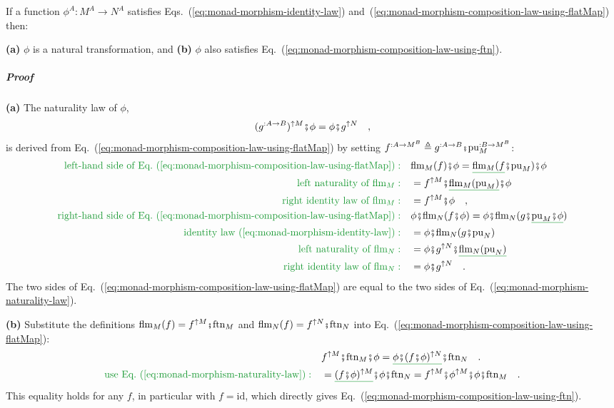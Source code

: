 If a function $\phi^{A}:M^{A}\rightarrow N^{A}$ satisfies Eqs.~(\ref{eq:monad-morphism-identity-law})
and~(\ref{eq:monad-morphism-composition-law-using-flatMap}) then:

\textbf{(a)} $\phi$ is a natural transformation, and \textbf{(b)}
$\phi$ also satisfies Eq.~(\ref{eq:monad-morphism-composition-law-using-ftn}).

\subparagraph{Proof}

\textbf{(a)} The naturality law of $\phi$,
\begin{equation}
(g^{:A\rightarrow B})^{\uparrow M}\bef\phi=\phi\bef g^{\uparrow N}\quad,\label{eq:monad-morphism-naturality-law}
\end{equation}
is derived from Eq.~(\ref{eq:monad-morphism-composition-law-using-flatMap})
by setting $f^{:A\rightarrow M^{B}}\triangleq g^{:A\rightarrow B}\bef\text{pu}_{M}^{:B\rightarrow M^{B}}$:
\begin{align*}
{\color{greenunder}\text{left-hand side of Eq.~(\ref{eq:monad-morphism-composition-law-using-flatMap})}:}\quad & \text{flm}_{M}(f)\bef\phi=\gunderline{\text{flm}_{M}(f}\bef\text{pu}_{M})\bef\phi\\
{\color{greenunder}\text{left naturality of }\text{flm}_{M}:}\quad & =f^{\uparrow M}\bef\gunderline{\text{flm}_{M}(\text{pu}_{M})}\bef\phi\\
{\color{greenunder}\text{right identity law of }\text{flm}_{M}:}\quad & =f^{\uparrow M}\bef\phi\quad,\\
{\color{greenunder}\text{right-hand side of Eq.~(\ref{eq:monad-morphism-composition-law-using-flatMap})}:}\quad & \phi\bef\text{flm}_{N}(f\bef\phi)=\phi\bef\text{flm}_{N}(g\bef\gunderline{\text{pu}_{M}\bef\phi})\\
{\color{greenunder}\text{identity law~(\ref{eq:monad-morphism-identity-law})}:}\quad & =\phi\bef\text{flm}_{N}(g\bef\text{pu}_{N})\\
{\color{greenunder}\text{left naturality of }\text{flm}_{N}:}\quad & =\phi\bef g^{\uparrow N}\bef\gunderline{\text{flm}_{N}(\text{pu}_{N})}\\
{\color{greenunder}\text{right identity law of }\text{flm}_{N}:}\quad & =\phi\bef g^{\uparrow N}\quad.
\end{align*}
The two sides of Eq.~(\ref{eq:monad-morphism-composition-law-using-flatMap})
are equal to the two sides of Eq.~(\ref{eq:monad-morphism-naturality-law}).

\textbf{(b)} Substitute the definitions $\text{flm}_{M}(f)=f^{\uparrow M}\bef\text{ftn}_{M}$
and $\text{flm}_{N}(f)=f^{\uparrow N}\bef\text{ftn}_{N}$ into Eq.~(\ref{eq:monad-morphism-composition-law-using-flatMap}):
\begin{align*}
 & f^{\uparrow M}\bef\text{ftn}_{M}\bef\phi=\gunderline{\phi\bef(f\bef\phi)^{\uparrow N}}\bef\text{ftn}_{N}\quad.\\
{\color{greenunder}\text{use Eq.~(\ref{eq:monad-morphism-naturality-law})}:}\quad & =\gunderline{(f\bef\phi)^{\uparrow M}}\bef\phi\bef\text{ftn}_{N}=f^{\uparrow M}\bef\phi^{\uparrow M}\bef\phi\bef\text{ftn}_{M}\quad.
\end{align*}
This equality holds for any $f$, in particular with $f=\text{id}$,
which directly gives Eq.~(\ref{eq:monad-morphism-composition-law-using-ftn}). 

